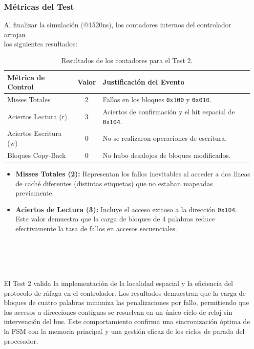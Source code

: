 \documentclass[12pt,a4paper]{article}
\begin{document}
\subsubsection{Métricas del Test}

Al finalizar la simulación (@1520ns), los contadores internos del controlador arrojan \\los siguientes resultados:

\begin{table}[H]
\centering
\small
\renewcommand{\arraystretch}{1.2}
\begin{tabular}{|l|c|l|}
\hline
\rowcolor[HTML]{EFEFEF} 
\textbf{Métrica de Control} & \textbf{Valor} & \textbf{Justificación del Evento} \\ \hline
Misses Totales & 2 & Fallos en los bloques \texttt{0x100} y \texttt{0x010}. \\ \hline
Aciertos Lectura (r) & 3 & Aciertos de confirmación y el hit espacial de \texttt{0x104}. \\ \hline
Aciertos Escritura (w) & 0 & No se realizaron operaciones de escritura. \\ \hline
Bloques Copy-Back & 0 & No hubo desalojos de bloques modificados. \\ \hline
\end{tabular}
\caption{Resultados de los contadores para el Test 2.}
\label{tab:audit_test2}
\end{table}

\begin{itemize}
    \item \textbf{Misses Totales (2):} Representan los fallos inevitables al acceder a dos líneas de caché diferentes (distintas etiquetas) que no estaban mapeadas previamente.
    \item \textbf{Aciertos de Lectura (3):} Incluye el acceso exitoso a la dirección \texttt{0x104}. Este valor demuestra que la carga de bloques de 4 palabras reduce efectivamente la tasa de fallos en accesos secuenciales.
\end{itemize}\\

\\

\newline
\\
\\
El Test 2 valida la implementación de la localidad espacial y la eficiencia del protocolo de ráfaga en el controlador. Los resultados demuestran que la carga de bloques de cuatro palabras minimiza las penalizaciones por fallo, permitiendo que los accesos a direcciones contiguas se resuelvan en un único ciclo de reloj sin intervención del bus. Este comportamiento confirma una sincronización óptima de la FSM con la memoria principal y una gestión eficaz de los ciclos de parada del procesador.
\end{document}
